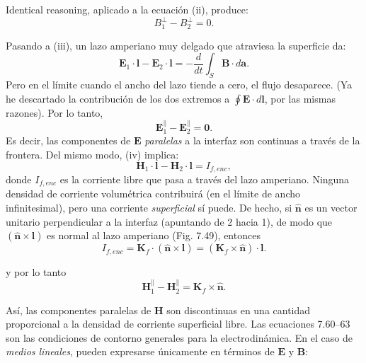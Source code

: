 \documentclass[12pt,a4paper]{report}
\newcommand{\esp}{\vspace{0.5cm}}
\begin{document}
	Identical reasoning, aplicado a la ecuación (ii), produce:
	\begin{equation}
		B_1^{\perp} - B_2^{\perp} = 0. \tag{7.61}
	\end{equation}
	
	Pasando a (iii), un lazo amperiano muy delgado que atraviesa la superficie da:
	\begin{equation*}
		\mathbf{E}_1 \cdot \mathbf{l} - \mathbf{E}_2 \cdot \mathbf{l} = -\frac{d}{dt} \int_S \mathbf{B} \cdot d\mathbf{a}.
	\end{equation*}
	Pero en el límite cuando el ancho del lazo tiende a cero, el flujo desaparece. (Ya he descartado la contribución de los dos extremos a $\oint \mathbf{E} \cdot d\mathbf{l}$, por las mismas razones). Por lo tanto,
	\begin{equation}
		\mathbf{E}_1^{\parallel} - \mathbf{E}_2^{\parallel} = \mathbf{0}. \tag{7.62}
	\end{equation}
	Es decir, las componentes de $\mathbf{E}$ \textit{paralelas} a la interfaz son continuas a través de la frontera. Del mismo modo, (iv) implica:
	\begin{equation*}
		\mathbf{H}_1 \cdot \mathbf{l} - \mathbf{H}_2 \cdot \mathbf{l} = I_{f, enc},
	\end{equation*}
	donde $I_{f, enc}$ es la corriente libre que pasa a través del lazo amperiano. Ninguna densidad de corriente volumétrica contribuirá (en el límite de ancho infinitesimal), pero una corriente \textit{superficial} sí puede. De hecho, si $\hat{\mathbf{n}}$ es un vector unitario perpendicular a la interfaz (apuntando de 2 hacia 1), de modo que $(\hat{\mathbf{n}} \times \mathbf{l})$ es normal al lazo amperiano (Fig. 7.49), entonces
	\begin{equation*}
		I_{f, enc} = \mathbf{K}_f \cdot (\hat{\mathbf{n}} \times \mathbf{l}) = (\mathbf{K}_f \times \hat{\mathbf{n}}) \cdot \mathbf{l}.
	\end{equation*}
	
	\esp
	
	\noindent y por lo tanto
	\begin{equation}
		\mathbf{H}_1^{\parallel} - \mathbf{H}_2^{\parallel} = \mathbf{K}_f \times \hat{\mathbf{n}}. \tag{7.63}
	\end{equation}
	
	Así, las componentes paralelas de $\mathbf{H}$ son discontinuas en una cantidad proporcional a la densidad de corriente superficial libre. Las ecuaciones 7.60--63 son las condiciones de contorno generales para la electrodinámica. En el caso de \textit{medios lineales}, pueden expresarse únicamente en términos de $\mathbf{E}$ y $\mathbf{B}$:
	
\end{document}
